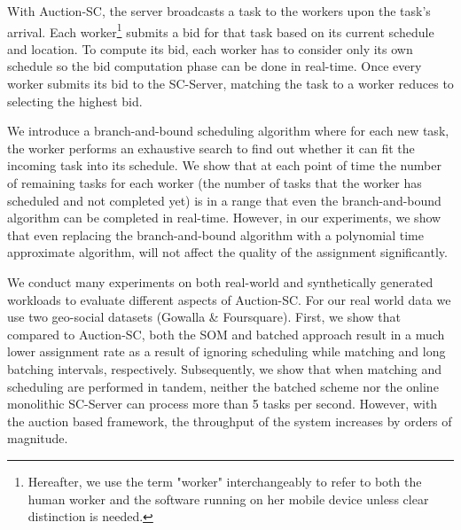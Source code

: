 With Auction-SC, the server broadcasts a task to the workers upon the task's arrival. Each worker\footnote{Hereafter, we use the term "worker" interchangeably to refer to both the human worker and the software running on her mobile device unless clear distinction is needed.} submits a bid for that task based on its current schedule and location. To compute its bid, each worker has to consider only its own schedule so the bid computation phase can be done in real-time. Once every worker submits its bid to the SC-Server, matching the task to a worker reduces to selecting the highest bid.

We introduce a branch-and-bound scheduling algorithm where for each new task, the worker performs an exhaustive search to find out whether it can fit the incoming task into its schedule. We show that at each point of time the number of remaining tasks for each worker (the number of tasks that the worker has scheduled and not completed yet) is in a range that even the branch-and-bound algorithm can be completed in real-time. However, in our experiments, we show that even replacing the branch-and-bound algorithm with a polynomial time approximate algorithm, will not affect the quality of the assignment significantly.


We conduct many experiments on both real-world and synthetically generated workloads to evaluate different aspects of Auction-SC. For our real world data we use two geo-social datasets (Gowalla \& Foursquare). First, we show that compared to Auction-SC, both the SOM and batched approach result in a much lower assignment rate as a result of ignoring scheduling while matching and long batching intervals, respectively. Subsequently, we show that when matching and scheduling are performed in tandem, neither the batched scheme nor the online monolithic SC-Server can process more than 5 tasks per second. However, with the auction based framework, the throughput of the system increases by orders of magnitude.


